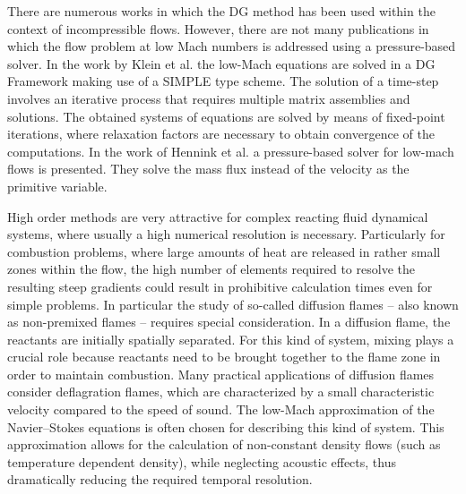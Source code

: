 There are numerous works in which the DG method has been used within the context of incompressible flows. \textcite{shahbaziHighorderDiscontinuousGalerkin2007,kummerBoSSSDiscontinuousGalerkin2012,kleinSIMPLEBasedDiscontinuous2013,rhebergenSpaceTimeDiscontinuous2013}  However, there are not many publications in which the flow problem at low Mach numbers is addressed using a pressure-based solver. In the work by Klein et al. \textcite{kleinHighorderDiscontinuousGalerkin2016} the low-Mach equations are solved in a DG Framework making use of a SIMPLE type scheme. The solution of a time-step involves an iterative process that requires multiple matrix assemblies and solutions. The obtained systems of equations are solved by means of fixed-point iterations, where relaxation factors are necessary to obtain convergence of the computations.
In the work of Hennink et al. \textcite{henninkPressurebasedSolverLowMach2021} a pressure-based solver for low-mach flows is presented. They solve  the mass flux instead of the velocity as the primitive variable.

High order methods are very attractive for complex reacting fluid dynamical systems, where usually a high numerical resolution is necessary. Particularly for combustion problems, where large amounts of heat are released in rather small zones within the flow, the high number of elements required to resolve the resulting steep gradients could result in prohibitive calculation times even for simple problems. In particular the study of so-called diffusion flames -- also known as non-premixed flames -- requires special consideration. In a diffusion flame, the reactants are initially spatially separated. For this kind of system, mixing plays a crucial role because reactants need to be brought together to the flame zone in order to maintain combustion. Many practical applications of diffusion flames consider deflagration flames, \textcite{poinsotTheoreticalNumericalCombustion2005} which are characterized by a small characteristic velocity compared to the speed of sound. The low-Mach approximation of the Navier--Stokes equations is often chosen for describing this kind of system. This approximation allows for the calculation of non-constant density flows (such as temperature dependent density), while neglecting acoustic effects, thus dramatically reducing the required temporal resolution. \textcite{mullerLowMachNumberAsymptoticsNavierStokes1998}

